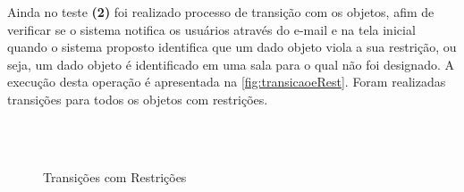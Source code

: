\par
Ainda no teste \textbf{(2)} foi realizado processo de transição com os objetos, afim de verificar se o sistema notifica os usuários através do e-mail e na tela inicial quando o sistema proposto identifica que um dado objeto viola a sua restrição, ou seja, um dado objeto é identificado em uma sala para o qual não foi designado. A execução desta operação é apresentada na \autoref{fig:transicaoeRest}. Foram realizadas transições para todos os objetos com restrições.

\begin{figure}[ht]
        \centering\caption{Transições com Restrições}
        \label{fig:transicaoeRest}
        \hspace{0.5cm}        
        \\
             \hspace{0.5cm}
             \\

\end{figure}
